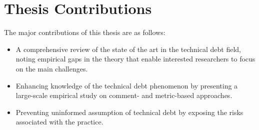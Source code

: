 \section{Thesis Contributions}
The major contributions of this thesis are as follows:
\begin{itemize}
	\item \revision A comprehensive review of the state of the art in the technical debt field, noting empirical gaps in the theory that enable interested researchers to focus on the main challenges.
	\item \revision Enhancing knowledge of the technical debt phenomenon by presenting a large-scale empirical study on comment- and metric-based approaches.
	\item \revision Preventing uninformed assumption of technical debt by exposing the risks associated with the practice.

\end{itemize}